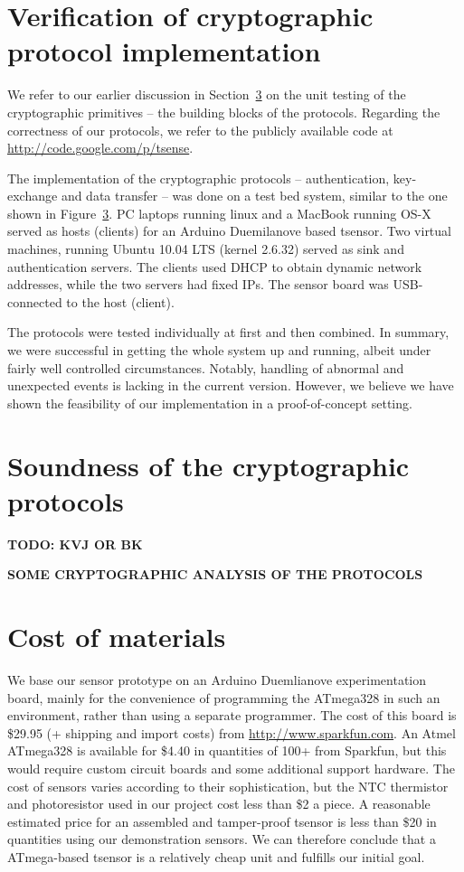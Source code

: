 \section{Verification of cryptographic protocol implementation}

We refer to our earlier discussion in Section~\ref{} on the unit testing of the cryptographic primitives -- the building blocks of the protocols. Regarding the correctness of our protocols, we refer to the publicly available code at \url{http://code.google.com/p/tsense}.

The implementation of the cryptographic protocols -- authentication, key-exchange and data transfer -- was done on a test bed system, similar to the one shown in Figure~\ref{}. PC laptops running linux and a MacBook running OS-X served as hosts (clients) for an Arduino Duemilanove based tsensor. Two virtual machines, running Ubuntu 10.04 LTS (kernel 2.6.32) served as sink and authentication servers. The clients used DHCP to obtain dynamic network addresses, while the two servers had fixed IPs. The sensor board was USB-connected to the host (client).

The protocols were tested individually at first and then combined. In summary, we were successful in getting the whole system up and running, albeit under fairly well controlled circumstances. Notably, handling of abnormal and unexpected events is lacking in the current version. However, we believe we have shown the feasibility of our implementation in a proof-of-concept setting.

\section{Soundness of the cryptographic protocols}

\textbf{TODO: KVJ OR BK}

\textbf{SOME CRYPTOGRAPHIC ANALYSIS OF THE PROTOCOLS}

\section{Cost of materials}

We base our sensor prototype on an Arduino Duemlianove experimentation board, mainly for the convenience of programming the ATmega328 in such an environment, rather than using a separate programmer. The cost of this board is \$29.95 (+ shipping and import costs) from \url{http://www.sparkfun.com}. An Atmel ATmega328 is available for \$4.40 in quantities of 100+ from Sparkfun, but this would require custom circuit boards and some additional support hardware. The cost of sensors varies according to their sophistication, but the NTC thermistor and photoresistor used in our project cost less than \$2 a piece. A reasonable estimated price for an assembled and tamper-proof tsensor is less than \$20 in quantities using our demonstration sensors. We can therefore conclude that a ATmega-based tsensor is a relatively cheap unit and fulfills our initial goal.

